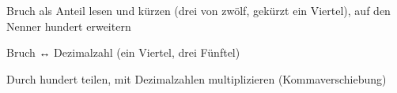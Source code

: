 \setcounter{aufgabe}{0}

\begin{aufgabe}{Bruch als Anteil lesen und kürzen (drei von zwölf, gekürzt ein Viertel), auf den Nenner hundert erweitern}
\end{aufgabe}

\begin{aufgabe}{Bruch ↔ Dezimalzahl (ein Viertel, drei Fünftel)}
\end{aufgabe}

\begin{aufgabe}{Durch hundert teilen, mit Dezimalzahlen multiplizieren (Kommaverschiebung)}
\end{aufgabe}


